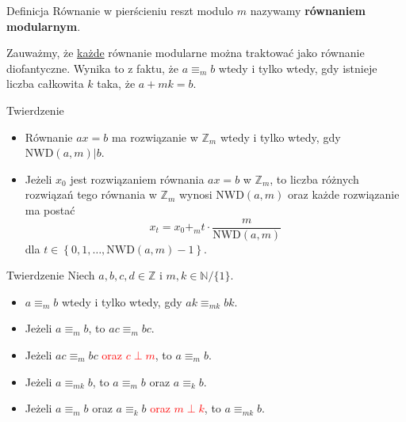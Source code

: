 \documentclass[a4paper,10pt]{beamer}
\begin{document}
\begin{frame}
	
	\begin{block}{Definicja}
		Równanie w pierścieniu reszt modulo $m$ nazywamy {\bf równaniem modularnym}.
	\end{block}

	Zauważmy, że \underline{każde} równanie modularne można traktować jako równanie diofantyczne. Wynika to z faktu, że $a\equiv_mb$ wtedy i tylko wtedy, gdy istnieje liczba całkowita $k$ taka, że $a+mk=b$.
	
	\begin{block}{Twierdzenie}
		\begin{itemize}
			\item Równanie $ax=b$ ma rozwiązanie w $\mathbb{Z}_m$ wtedy i tylko wtedy, gdy $\mbox{NWD}(a,m)|b$.
			\item Jeżeli $x_0$ jest rozwiązaniem równania $ax=b$ w $\mathbb{Z}_m$, to liczba różnych rozwiązań tego równania w $\mathbb{Z}_m$ wynosi $\mbox{NWD}(a,m)$ oraz każde rozwiązanie ma postać
			$$x_t=x_0+_mt\cdot\frac{m}{\mbox{NWD}(a,m)}$$ 
			dla $t\in\left\{0,1,\ldots,\mbox{NWD}(a,m)-1\right\}$.
		\end{itemize}	
	\end{block}
	
\end{frame}



\begin{frame}

	\begin{block}{Twierdzenie}
		Niech $a,b,c,d\in\mathbb{Z}$ i $m,k\in\mathbb{N}/\{1\}$.
		\begin{itemize}
			\item $a\equiv_mb$ wtedy i tylko wtedy, gdy $ak\equiv_{mk}bk$.
			\item Jeżeli $a\equiv_mb$, to $ac\equiv_mbc$.
			\item Jeżeli $ac\equiv_mbc$ \textcolor{red}{oraz $c\perp m$}, to $a\equiv_mb$.
			\item Jeżeli $a\equiv_{mk}b$, to $a\equiv_mb$ oraz $a\equiv_kb$.
			\item Jeżeli  $a\equiv_mb$ oraz $a\equiv_kb$ \textcolor{red}{oraz $m\perp k$}, to $a\equiv_{mk}b$.
		\end{itemize}
	\end{block}
	
\end{frame}
\end{document}

